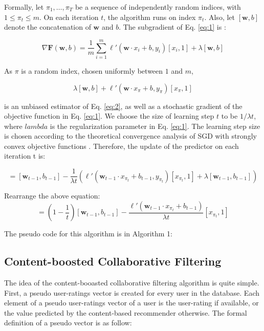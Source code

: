 \noindent Formally, let \( \pi_1, \dots, \pi_T \) be a sequence of independently random indices, with \( 1 \leq \pi_t \leq m \). On each iteration \( t\), the algorithm runs on index \(\pi_t\). Also, let \([\mathbf{w}, b] \) denote the concatenation of \(\mathbf{w}\) and \(b\). The subgradient of Eq. \eqref{eq:1} is :

\begin{displaymath}
\nabla \mathbf{F} (\mathbf{w}, b) = \frac{1}{m} \sum_{i=1}^{m} \ell' (\mathbf{w} \cdot x_i + b, y_i) [x_i, 1] + \lambda [\mathbf{w}, b] \tag{2} \label{eq:2}
\end{displaymath}

\noindent As \(\pi\) is a random index, chosen uniformly between \(1\) and \(m\), 

\begin{displaymath}
\lambda [\mathbf{w}, b] + \ell' (\mathbf{w} \cdot x_\pi + b, y_\pi) [x_\pi, 1]
\end{displaymath}

\noindent is an unbiased estimator of Eq. \eqref{eq:2}, as well as a stochastic gradient of the objective function in Eq. \eqref{eq:1}. We choose the size of learning step \(t \) to be \( 1/\lambda t\), where  \(lambda\) is the regularization parameter in Eq. \eqref{eq:1}. The learning step size is chosen according to the theoretical convergence analysis of SGD with strongly convex objective functions \cite{hazan2007logarithmic}. Therefore, the update of the predictor on each iteration t is:

\begin{displaymath}
[\mathbf{w}_t, b_t] = [\mathbf{w}_{t-1},b_{t-1}] - \frac{1}{\lambda t} \left(\ell' (\mathbf{w}_{t-1} \cdot x_{\pi_t} + b_{t-1}, y_{\pi_t}) [x_{\pi_t},1] + \lambda [\mathbf{w}_{t-1}, b_{t-1}]\right) 
\end{displaymath}

\noindent Rearrange the above equation:
\begin{displaymath}
[\mathbf{w}_t, b_t] = \left(1 - \frac{1}{t}\right) \left[\mathbf{w}_{t-1}, b_{t-1}\right] - \frac{\ell' (\mathbf{w}_{t-1} \cdot x_{\pi_t} + b_{t-1})}{\lambda t} [x_{\pi_t}, 1]
\end{displaymath}

\noindent The pseudo code for this algorithm is in Algorithm 1:
 

\subsection{Content-boosted Collaborative Filtering}
The idea of the content-booasted collaborative filtering algorithm is quite simple. First, a pseudo user-ratings vector is created for every user in the database. Each element of a pseudo user-ratings vector of a user is the user-rating if available, or the value predicted by the content-based recommender otherwise. The formal definition of a pseudo vector is as follow:

